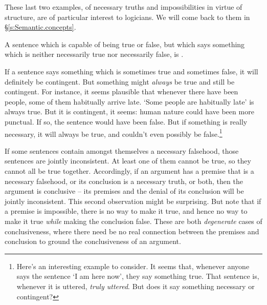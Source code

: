 These last two examples, of necessary truths and impossibilities in virtue of structure, are of particular interest to logicians. We will come back to them in §\ref{s:Semantic.concepts}.

A sentence which is capable of being true or false, but which says something which is neither necessarily true nor necessarily false, is .

If a sentence says something which is sometimes true and sometimes false, it will definitely be contingent. But something might \emph{always} be true and still be contingent. For instance, it seems plausible that whenever there have been people, some of them habitually arrive late. `Some people are habitually late' is always true. But it is contingent, it seems: human nature could have been more punctual. If so, the sentence would have been false. But if something is really necessary, it will always be true, and couldn't even possibly be false.\footnote{Here's an interesting example to consider. It seems that, whenever anyone says the sentence `I am here now', they say something true. That sentence is, whenever it is uttered, \emph{truly uttered}. But does it say something necessary or contingent?}


If some sentences contain amongst themselves a necessary falsehood, those sentences are jointly inconsistent. At least one of them cannot be true, so they cannot all be true together. Accordingly, if an argument has a premise that is a necessary falsehood, or its conclusion is a necessary truth, or both, then the argument is conclusive – its premises and the denial of its conclusion will be jointly inconsistent.  This second observation might be surprising. But note that if a premise is impossible, there is no way to make it true, and hence no way to make it true \emph{while} making the conclusion false. These are both \emph{degenerate} cases of conclusiveness, where there need be no real connection between the premises and conclusion to ground the conclusiveness of an argument.



